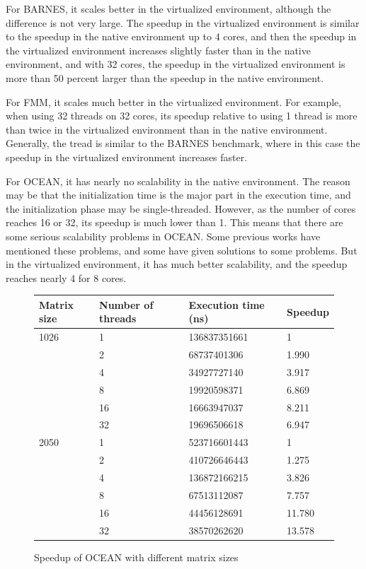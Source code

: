 For BARNES, it scales better in the virtualized environment, although the
difference is not very large. The speedup in the virtualized environment
is similar to the speedup in the native environment up to 4 cores, and then
the speedup in the virtualized environment increases slightly faster than
in the native environment, and with 32 cores, the speedup in the virtualized
environment is more than 50 percent larger than the speedup in the native
environment.

For FMM, it scales much better in the virtualized environment. For example, 
when using 32 threads on 32 cores, its speedup relative to using 1 thread 
is more than twice in the virtualized environment than in the native 
environment. Generally, the tread is similar to the BARNES benchmark, where
in this case the speedup in the virtualized environment increases faster.

For OCEAN, it has nearly no scalability in the native environment. The reason
may be that the initialization time is the major part in the execution time,
and the initialization phase may be single-threaded. However, as the number
of cores reaches 16 or 32, its speedup is much lower than 1. This means that there
are some serious scalability problems in OCEAN. Some previous works \cite{rel:oceanscale}
\cite{rel:oceanscale2}
have mentioned these problems, and some have given solutions to some problems.
But in the virtualized environment, it has much better scalability, and
the speedup reaches nearly 4 for 8 cores.

\begin{figure}[here]
	\center
	\begin{tabular}{ l | l | l | l}
	Matrix size &	Number of threads &  Execution time (ns) & Speedup \\
	\hline
	1026 &	1	&	136837351661	&	1\\
	&	2	&	68737401306	&	1.990\\
	&	4	&	34927727140	&	3.917\\
	&	8	&	19920598371	&	6.869\\
	&	16	&	16663947037	&	8.211\\
	&	32	&	19696506618	&	6.947\\
	\hline
	2050 & 	1	&	523716601443	&	1\\
	&	2	&	410726646443	&	1.275\\
	&	4	&	136872166215	&	3.826\\
	&	8	&	67513112087	&	7.757\\
	&	16	&	44456128691	&	11.780\\
	&	32	&	38570262620	&	13.578\\
\end{tabular}
\caption{Speedup of OCEAN with different matrix sizes}
\label{fig:ocean_matrix}
\end{figure}

